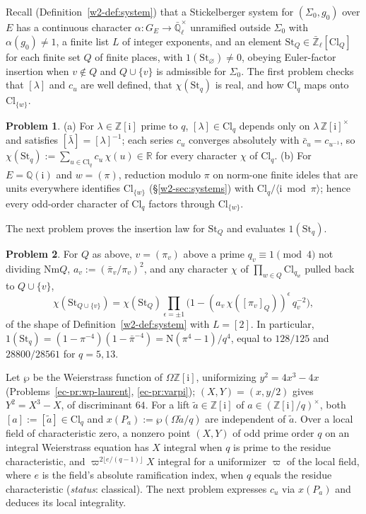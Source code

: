 \documentclass[reqno]{amsart}
\theoremstyle{definition}
\newtheorem{problem}{Problem}[section]
\theoremstyle{plain}
\theoremstyle{remark}
\newcommand{\Z}{\mathbb{Z}}
\newcommand{\Q}{\mathbb{Q}}
\newcommand{\R}{\mathbb{R}}
\newcommand{\Ql}{\bar{\mathbb{Q}}_\ell}
\newcommand{\Zl}{\bar{\mathbb{Z}}_\ell}
\newcommand{\ii}{\mathrm{i}}
\newcommand{\St}{\mathrm{St}}
\newcommand{\Cl}{\mathrm{Cl}}
\newcommand{\Nm}{\mathrm{Nm}}
\begin{document}
Recall (Definition~\ref{w2-def:system}) that a Stickelberger system for \((\Sigma_0, g_0)\) over \(E\) has a continuous character \(\alpha \colon G_E \to \Ql^\times\) unramified outside \(\Sigma_0\) with \(\alpha(g_0) \ne 1\), a finite list \(L\) of integer exponents, and an element \(\St_Q \in \Zl[\Cl_Q]\) for each finite set \(Q\) of finite places, with \(1(\St_\varnothing) \ne 0\), obeying Euler-factor insertion when \(v \notin Q\) and \(Q \cup \{v\}\) is admissible for \(\Sigma_0\).  The first problem checks that \([\lambda]\) and \(c_u\) are well defined, that \(\chi(\St_q)\) is real, and how \(\Cl_q\) maps onto \(\Cl_{\{w\}}\).

\begin{problem}\label{pr:clq}
\textup{(a)} For \(\lambda \in \Z[\ii]\) prime to \(q\), \([\lambda] \in \Cl_q\) depends only on \(\lambda\,\Z[\ii]^\times\) and satisfies \([\bar\lambda] = [\lambda]^{-1}\); each series \(c_u\) converges absolutely with \(\bar c_u = c_{u^{-1}}\), so \(\chi(\St_q) := \sum_{u \in \Cl_q} c_u\,\chi(u) \in \R\) for every character \(\chi\) of \(\Cl_q\).
\textup{(b)} For \(E = \Q(\ii)\) and \(w = (\pi)\), reduction modulo \(\pi\) on norm-one finite ideles that are units everywhere identifies \(\Cl_{\{w\}}\) (\S\ref{w2-sec:systems}) with \(\Cl_q / \langle \ii \bmod \pi\rangle\); hence every odd-order character of \(\Cl_q\) factors through \(\Cl_{\{w\}}\).
\end{problem}

The next problem proves the insertion law for \(\St_Q\) and evaluates \(1(\St_q)\).

\begin{problem}\label{pr:insert}
For \(Q\) as above, \(v = (\pi_v)\) above a prime \(q_v \equiv 1 \pmod 4\) not dividing \(\Nm Q\), \(a_v := (\bar\pi_v/\pi_v)^2\), and any character \(\chi\) of \(\prod_{w \in Q} \Cl_{q_w}\) pulled back to \(Q \cup \{v\}\),
\[
  \chi(\St_{Q \cup \{v\}}) = \chi(\St_Q) \prod_{\epsilon = \pm 1} \bigl(1 - (a_v\,\chi([\pi_v]_Q))^{\epsilon}\, q_v^{-2}\bigr),
\]
of the shape of Definition~\ref{w2-def:system} with \(L = [2]\).  In particular, \(1(\St_q) = (1 - \pi^{-4})(1 - \bar\pi^{-4}) = \mathrm{N}(\pi^4 - 1)/q^4\), equal to \(128/125\) and \(28800/28561\) for \(q = 5, 13\).
\end{problem}

Let \(\wp\) be the Weierstrass function of \(\Omega\Z[\ii]\), uniformizing \(y^2 = 4x^3 - 4x\) (Problems~\ref{ec-pr:wp-laurent}, \ref{ec-pr:varpi}); \((X, Y) = (x, y/2)\) gives \(Y^2 = X^3 - X\), of discriminant \(64\).  For a lift \(\tilde a \in \Z[\ii]\) of \(a \in (\Z[\ii]/q)^\times\), both \([a] := [\tilde a] \in \Cl_q\) and \(x(P_a) := \wp(\Omega\tilde a/q)\) are independent of \(\tilde a\).  Over a local field of characteristic zero, a nonzero point \((X, Y)\) of odd prime order \(q\) on an integral Weierstrass equation has \(X\) integral when \(q\) is prime to the residue characteristic, and \(\varpi^{2\lfloor e/(q-1)\rfloor} X\) integral for a uniformizer \(\varpi\) of the local field, where \(e\) is the field's absolute ramification index, when \(q\) equals the residue characteristic \cite[Thm.~VII.3.4]{Si1} (\emph{status}: classical).  The next problem expresses \(c_u\) via \(x(P_a)\) and deduces its local integrality.
\end{document}
